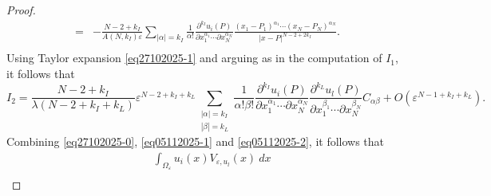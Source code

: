 \documentclass[11pt,reqno]{article}
\numberwithin{equation}{section}
\newcommand\e\varepsilon
\renewcommand\O\Omega
\begin{document}
\begin{proof}
\begin{align*}
                   =&-\frac{N-2+{ k_I}}{A(N,{ k_I})\e} \sum_{|\alpha|={ k_I}}\frac1{\alpha!}
					\frac{\partial^{{ k_I}}u_i(P)}{\partial x_1^{\alpha_1}\cdots\partial x_N^{\alpha_N}}\frac{(x_1-P_1)^{\alpha_1}\cdots (x_N-P_N)^{\alpha_N}}
					{|x-P|^{N-2+2{ k_I}}}.\\
        \end{align*}
        Using Taylor expansion \eqref{eq27102025-1}  and arguing as in the computation of $I_1$, it follows that
        \begin{equation}\label{eq05112025-2}
            I_2=\frac{N-2+{ k_I}}{\lambda (N-2+k_I+k_L) }\e^{N-2+k_I+k_L}	\sum_{\substack{|\alpha|={ k_I}\\
           |\beta|={ k_L}}}\frac{1}{\alpha!\beta!}\frac{\partial^{{ k_I}} u_i (P)}{\partial x_{1}^{\alpha_1}\cdots\partial x_{N}^{\alpha_N}}\frac{\partial^{{ k_L}} u_l (P)}{\partial x_{1}^{\beta_1}\cdots\partial x_{N}^{\beta_N}} C_{\alpha\beta}
            +O(\e^{N-1+{ k_I}+{ k_L}}).
        \end{equation}
    Combining \eqref{eq27102025-0}, \eqref{eq05112025-1} and \eqref{eq05112025-2}, it follows that
    \begin{equation}
    \begin{aligned}
        &\int_{\O_\e}u_i(x) V_{\e,u_l}(x)\ dx\\

\end{aligned}
\end{equation}
\end{proof}
\end{document}
